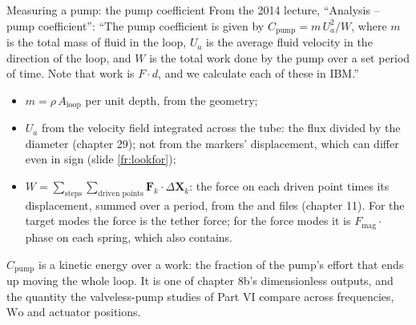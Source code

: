 \documentclass[aspectratio=169,11pt]{beamer}
\begin{document}
\begin{frame}{Measuring a pump: the pump coefficient}
\label{fr:cpump}
\small From the 2014 lecture, ``Analysis -- pump coefficient'': ``The pump coefficient is given by $C_{\mathrm{pump}} = m\,U_a^2/W$, where $m$ is the total mass of fluid in the loop, $U_a$ is the average fluid velocity in the direction of the loop, and $W$ is the total work done by the pump over a set period of time. Note that work is $F\cdot d$, and we calculate each of these in IBM.''
\begin{itemize}
  \item $m = \rho\,A_{\mathrm{loop}}$ per unit depth, from the geometry;
  \item $U_a$ from the velocity field integrated across the tube: the flux divided by the diameter (chapter 29); not from the markers' displacement, which can differ even in sign (slide \ref{fr:lookfor});
  \item $W = \sum_{\text{steps}}\sum_{\text{driven points}} \mathbf{F}_k\cdot\Delta\mathbf{X}_k$: the force on each driven point times its displacement, summed over a period, from the  and  files (chapter 11). For the target modes the force is the tether force; for the force modes it is $F_{\mathrm{mag}}\cdot$phase on each spring, which  also contains.
\end{itemize}
\vspace{1mm}
\begin{punchbox}
\small $C_{\mathrm{pump}}$ is a kinetic energy over a work: the fraction of the pump's effort that ends up moving the whole loop. It is one of chapter 8b's dimensionless outputs, and the quantity the valveless-pump studies of Part VI compare across frequencies, $\mathrm{Wo}$ and actuator positions.
\end{punchbox}
\end{frame}
\end{document}
